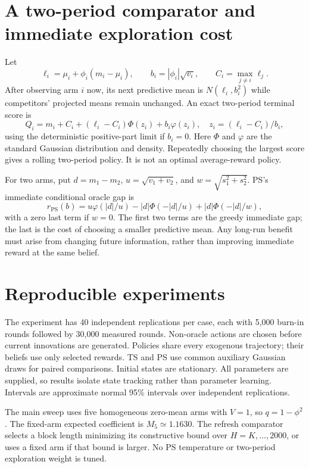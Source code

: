 \documentclass[11pt]{article}
\begin{document}
\section{A two-period comparator and immediate exploration cost}
Let
\[
\ell_i=\mu_i+\phi_i(m_i-\mu_i),\qquad b_i=|\phi_i|\sqrt{v_i},
\qquad C_i=\max_{j\ne i}\ell_j.
\]
After observing arm $i$ now, its next predictive mean is $N(\ell_i,b_i^2)$ while competitors' projected means remain unchanged. An exact two-period terminal score is
\begin{equation}
Q_i=m_i+C_i+(\ell_i-C_i)\Phi(z_i)+b_i\varphi(z_i),\quad
z_i=(\ell_i-C_i)/b_i,
\end{equation}
using the deterministic positive-part limit if $b_i=0$. Here $\Phi$ and $\varphi$ are the standard Gaussian distribution and density. Repeatedly choosing the largest score gives a rolling two-period policy. It is not an optimal average-reward policy.

For two arms, put $d=m_1-m_2$, $u=\sqrt{v_1+v_2}$, and $w=\sqrt{s_1^2+s_2^2}$. PS's immediate conditional oracle gap is
\begin{equation}
r_{\mathrm{PS}}(b)=u\varphi(|d|/u)-|d|\Phi(-|d|/u)
+|d|\Phi(-|d|/w),
\end{equation}
with a zero last term if $w=0$. The first two terms are the greedy immediate gap; the last is the cost of choosing a smaller predictive mean. Any long-run benefit must arise from changing future information, rather than improving immediate reward at the same belief.

\section{Reproducible experiments}
The experiment has 40 independent replications per case, each with 5,000 burn-in rounds followed by 30,000 measured rounds. Non-oracle actions are chosen before current innovations are generated. Policies share every exogenous trajectory; their beliefs use only selected rewards. TS and PS use common auxiliary Gaussian draws for paired comparisons. Initial states are stationary. All parameters are supplied, so results isolate state tracking rather than parameter learning. Intervals are approximate normal 95\% intervals over independent replications.

The main sweep uses five homogeneous zero-mean arms with $V=1$, so $q=1-\phi^2$. The fixed-arm expected coefficient is $M_5\simeq1.1630$. The refresh comparator selects a block length minimizing its constructive bound over $H=K,\ldots,2000$, or uses a fixed arm if that bound is larger. No PS temperature or two-period exploration weight is tuned.
\end{document}
